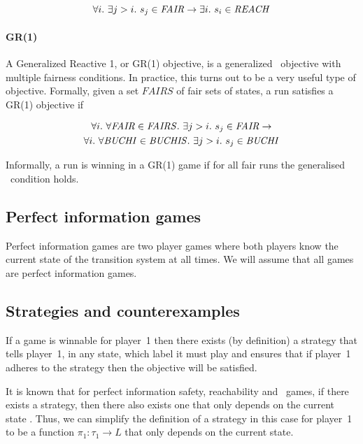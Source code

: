 \begin{equation}
\forall i.\ \exists j>i.\ s_j \in \mathit{FAIR} \rightarrow \exists i.\ s_i \in \mathit{REACH}
\end{equation}

\paragraph{GR(1)}
A Generalized Reactive 1, or GR(1) \cite{Piterman_PS_06} objective, is a generalized \buchi\ objective with multiple fairness conditions. In practice, this turns out to be a very useful type of objective. Formally, given a set $FAIRS$ of fair sets of states, a run satisfies a GR(1) objective if 

\begin{multline}
\forall i.\ \forall \fairobj \in \genfairobj.\ \exists j>i.\ s_j \in \fairobj \rightarrow \\ \forall i.\ \forall \buchiobj \in \genbuchiobj.\ \exists j>i.\ s_j \in \buchiobj
\end{multline}

Informally, a run is winning in a GR(1) game if for all fair runs the generalised \buchi\ condition holds.

\subsection{Perfect information games}

Perfect information games are two player games where both players know the current state of the transition system at all times. We will assume that all games are perfect information games.

\subsection{Strategies and counterexamples}
\label{sec:strat_and_cex}

If a game is winnable for player~1 then there exists (by definition) a strategy that tells player~1, in any state, which label it must play and ensures that if player~1 adheres to the strategy then the objective will be satisfied.

It is known that for perfect information safety, reachability and \buchi\ games, if there exists a strategy, then there also exists one that only depends on the current state \cite{Gradel}. Thus, we can simplify the definition of a strategy in this case for player~1 to be a function $\pi_1 : \tau_1 \rightarrow L$ that only depends on the current state.

